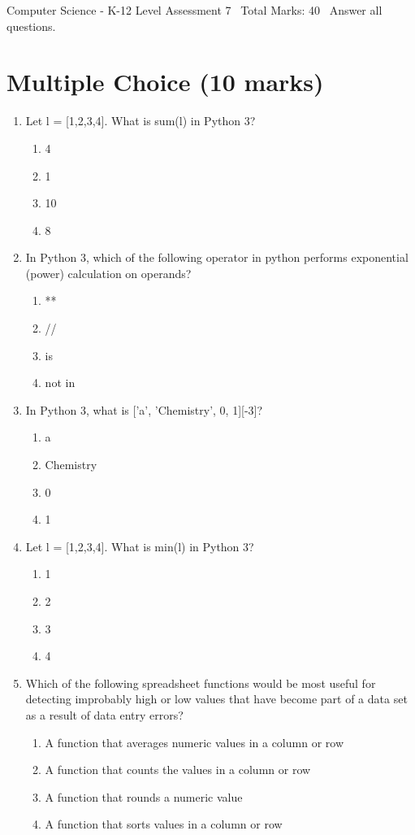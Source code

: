 \documentclass[12pt]{article}
\begin{document}
\begin{center}
Computer Science - K-12 Level Assessment 7 \
Total Marks: 40 \
Answer all questions.
\end{center}

\section*{Multiple Choice (10 marks)}
\begin{enumerate}[label=\arabic*.]
\item Let l = [1,2,3,4]. What is sum(l) in Python 3?
\begin{enumerate}[label=(\alph*)]
    \item 4
    \item 1
    \item 10
    \item 8
\end{enumerate}
\item In Python 3, which of the following operator in python performs exponential (power) calculation on operands?
\begin{enumerate}[label=(\alph*)]
    \item **
    \item //
    \item is
    \item not in
\end{enumerate}
\item In Python 3, what is ['a', 'Chemistry', 0, 1][-3]?
\begin{enumerate}[label=(\alph*)]
    \item a
    \item Chemistry
    \item 0
    \item 1
\end{enumerate}
\item Let l = [1,2,3,4]. What is min(l) in Python 3?
\begin{enumerate}[label=(\alph*)]
    \item 1
    \item 2
    \item 3
    \item 4
\end{enumerate}
\item Which of the following spreadsheet functions would be most useful for detecting improbably high or low values that have become part of a data set as a result of data entry errors?
\begin{enumerate}[label=(\alph*)]
    \item A function that averages numeric values in a column or row
    \item A function that counts the values in a column or row
    \item A function that rounds a numeric value
    \item A function that sorts values in a column or row
\end{enumerate}
\end{enumerate}
\end{document}
